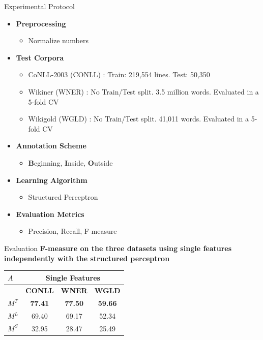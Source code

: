 \documentclass[10pt,xcolor=table]{beamer}
\newcommand\mlex{M^{\scriptscriptstyle L}}
\newcommand\msyn{M^{\scriptscriptstyle S}}
\newcommand\mstd{M^{\scriptscriptstyle T}}
\begin{document}
\begin{frame}{Experimental Protocol}
	\begin{itemize}
		\item \large \textbf{Preprocessing}
			\begin{itemize}
				\item Normalize numbers
			\end{itemize}
		\item \textbf{Test Corpora}
			\begin{itemize}
			\item CoNLL-2003 (CONLL) \cite{SangM03}: Train: 219,554 lines. Test: 50,350 
			\item Wikiner (WNER) \cite{Nothman2009}: No Train/Test split. 3.5 million words. Evaluated in a 5-fold CV
			\item Wikigold (WGLD) \cite{Balasuriya2009}: No Train/Test split. 41,011 words. Evaluated in a 5-fold CV
			\end{itemize}
		\item \textbf{Annotation Scheme}
			\begin{itemize}
				\item \textbf{B}eginning, \textbf{I}nside, \textbf{O}utside
			\end{itemize}
		\item \textbf{Learning Algorithm}
			\begin{itemize}
				\item Structured Perceptron \cite{Collins2002}
			\end{itemize}

		\item \textbf{Evaluation Metrics}
			\begin{itemize}
				\item Precision, Recall, F-measure
			\end{itemize}
	\end{itemize}	 
	\vspace{\textheight}
\end{frame}

\begin{frame}{Evaluation}
\textbf{F-measure on the three datasets using single features independently with the structured perceptron}
\vspace{1cm}
\begin{center}
	\begin{tabular}{@{}lccc@{}}
	\toprule
	$A$                           & \multicolumn{3}{c}{\textbf{Single Features}} \\ \midrule
	                & \textbf{CONLL}    & \textbf{WNER}     & \textbf{WGLD}    \\ \cmidrule{2-4}
	$\mstd$                        & \textbf{77.41}    & \textbf{77.50}    & \textbf{59.66}   \\
	$\mlex$                       & 69.40    & 69.17    & 52.34   \\
	$\msyn$                        & 32.95    & 28.47    & 25.49   \\ \bottomrule
	\end{tabular}
\end{center}
\vspace{\textheight}
\end{frame}
\end{document}

